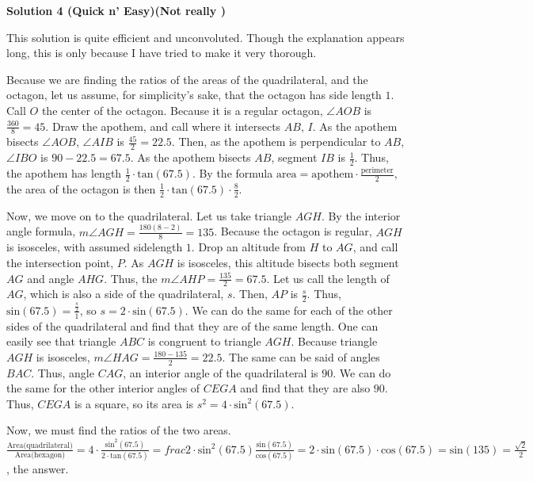 \begin{enumerate}
\textbf{Solution 4 (Quick n' Easy)(Not really )}

This solution is quite efficient and unconvoluted. Though the explanation appears long, this is only because I have tried to make it very thorough. 

 Because we are finding the ratios of the areas of the quadrilateral, and the octagon, let us assume, for simplicity's sake, that the octagon has side length $1$. Call $O$ the center of the octagon. Because it is a regular octagon, $\angle AOB$ is $\frac{360}{8}=45$. Draw the apothem, and call where it intersects $AB$, $I$. As the apothem bisects $\angle AOB$, $\angle AIB$ is $\frac{45}{2}=22.5$. Then, as the apothem is perpendicular to $AB$, $\angle IBO$ is $90-22.5=67.5$. As the apothem bisects $AB$, segment $IB$ is $\frac{1}{2}$. Thus, the apothem has length $\frac{1}{2} \cdot \text{tan}(67.5)$. By the formula $\text{area} = \text{apothem} \cdot \frac{\text{perimeter}}{2}$, the area of the octagon is then $\frac{1}{2} \cdot \text{tan}(67.5) \cdot \frac{8}{2}$.

 Now, we move on to the quadrilateral. Let us take triangle $AGH$. By the interior angle formula, $m \angle AGH = \frac{180 (8-2)}{8} = 135$. Because the octagon is regular, $AGH$ is isosceles, with assumed sidelength $1$. Drop an altitude from $H$ to $AG$, and call the intersection point, $P$. As $AGH$ is isosceles, this altitude bisects both segment $AG$ and angle $AHG$. Thus, the $m \angle AHP = \frac{135}{2} = 67.5$. Let us call the length of $AG$, which is also a side of the quadrilateral, $s$. Then, $AP$ is $\frac{s}{2}$. Thus, $\text{sin}(67.5) = \frac{\frac{s}{2}}{1}$, so $s = 2 \cdot \text{sin}(67.5)$. We can do the same for each of the other sides of the quadrilateral and find that they are of the same length. One can easily see that triangle $ABC$ is congruent to triangle $AGH$. Because triangle $AGH$ is isosceles, $m \angle HAG = \frac{180-135}{2} = 22.5$. The same can be said of angles $BAC$. Thus, angle $CAG$, an interior angle of the quadrilateral is $90$. We can do the same for the other interior angles of $CEGA$ and find that they are also $90$. Thus, $CEGA$ is a square, so its area is $s^2 = 4 \cdot \text{sin}^2(67.5)$. 

 Now, we must find the ratios of the two areas.$\frac{\text{Area(quadrilateral)}}{\text{Area(hexagon)}}  = 4 \cdot \frac{\text{sin}^2(67.5)}{2\cdot \text{tan}(67.5)}  =frac{2\cdot \text{sin}^2(67.5)}{\frac{\text{sin}(67.5)}{\text{cos}(67.5)}}   = 2\cdot \text{sin}(67.5) \cdot \text{cos}(67.5)   = \text{sin} (135) = \frac{\sqrt{2}}{2}$, the answer.


\end{enumerate}
